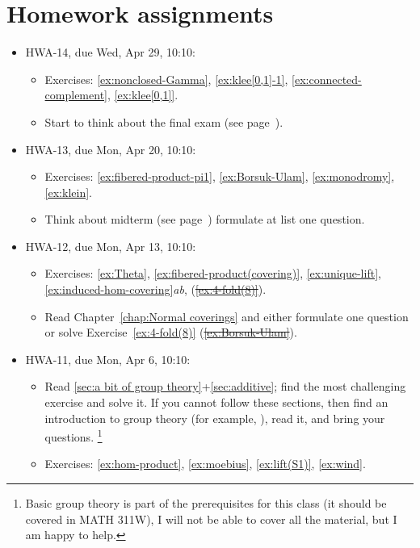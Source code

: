 \chapter*{Homework assignments}

\begin{itemize}

\item HWA-14, due Wed, Apr 29, 10:10:
\begin{itemize}
\item Exercises: \ref{ex:nonclosed-Gamma}, \ref{ex:klee[0,1]-1}, \ref{ex:connected-complement}, \ref{ex:klee[0,1]}.
\item Start to think about the final exam (see page~\pageref{Final}).
\end{itemize}

\item HWA-13, due Mon, Apr 20, 10:10:
\begin{itemize}
\item Exercises:
\ref{ex:fibered-product-pi1},
\ref{ex:Borsuk-Ulam},
\ref{ex:monodromy},
\ref{ex:klein}.
\item Think about midterm (see page~\pageref{MT2}) formulate at list one question.
\end{itemize}

\item HWA-12, due Mon, Apr 13, 10:10:
\begin{itemize}
\item Exercises: \ref{ex:Theta}, \ref{ex:fibered-product(covering)}, \ref{ex:unique-lift}, \ref{ex:induced-hom-covering}\textit{ab}, (\sout{\ref{ex:4-fold(8)}}).
\item Read Chapter~\ref{chap:Normal coverings} and either formulate one question or solve Exercise~\ref{ex:4-fold(8)} (\sout{\ref{ex:Borsuk-Ulam}}).
\end{itemize}

\item HWA-11, due Mon, Apr 6, 10:10:
\begin{itemize}
\item Read \ref{sec:a bit of group theory}+\ref{sec:additive}; find the most challenging exercise and solve it.
If you cannot follow these sections, then find an introduction to group theory (for example, \cite[Chapter 2]{connell}), read it, and bring your questions.%
\footnote{Basic group theory is part of the prerequisites for this class (it should be covered in MATH 311W), I will not be able to cover all the material, but I am happy to help.}
\item Exercises: \ref{ex:hom-product}, \ref{ex:moebius}, \ref{ex:lift(S1)}, \ref{ex:wind}.
\end{itemize}


\end{itemize}
